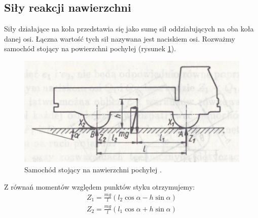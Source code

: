 \documentclass{article}
\begin{document}
	\subsection{Siły reakcji nawierzchni}
	Siły działające na koła przedstawia się jako sumę sił oddziałujących na oba koła danej osi. Łączna wartość tych sił nazywana jest naciskiem osi. Rozważmy samochód stojący na powierzchni pochyłej (rysunek \ref{fig:rozklad_sil_pojazd}).
	\begin{figure}[h!]
		\centering
		\includegraphics{rozklad_sil_pojazd.jpg}
		\caption{Samochód stojący na nawierzchni pochyłej \cite{Arczynski}.}
		\label{fig:rozklad_sil_pojazd}
	\end{figure}
	Z równań momentów względem punktów styku otrzymujemy:
	\begin{align}
		Z_1=\frac{mg}{l}(l_2\cos \alpha -h\sin \alpha)\\
		Z_2=\frac{mg}{l}(l_1\cos \alpha +h\sin \alpha)
	\end{align}
	
\end{document}
